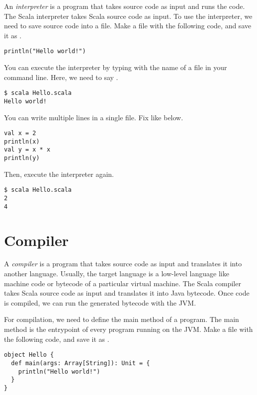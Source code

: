 An \textit{interpreter} is a program that takes source code as input and runs the code.
The Scala interpreter takes Scala source code as input. To use the interpreter,
we need to save source code into a file. Make a file with the following code, and
save it as .

\begin{verbatim}
println("Hello world!")
\end{verbatim}

You can execute the interpreter by typing  with the name of a file in
your command line. Here, we need to say .

\begin{verbatim}
$ scala Hello.scala
Hello world!
\end{verbatim}

You can write multiple lines in a single file. Fix  like
below.

\begin{verbatim}
val x = 2
println(x)
val y = x * x
println(y)
\end{verbatim}

Then, execute the interpreter again.

\begin{verbatim}
$ scala Hello.scala
2
4
\end{verbatim}

\section{Compiler}

A \textit{compiler} is a program that takes source code as input and translates it into
another language. Usually, the target language is a low-level language like
machine code or bytecode of a particular virtual machine.
The Scala compiler takes Scala source code as input and translates it into Java
bytecode. Once code is compiled, we can run the generated bytecode with the JVM.

For compilation, we need to define the main method of a program. The main method
is the entrypoint of every program running on the JVM.
Make a file with the following code, and save it as .

\begin{verbatim}
object Hello {
  def main(args: Array[String]): Unit = {
    println("Hello world!")
  }
}
\end{verbatim}

